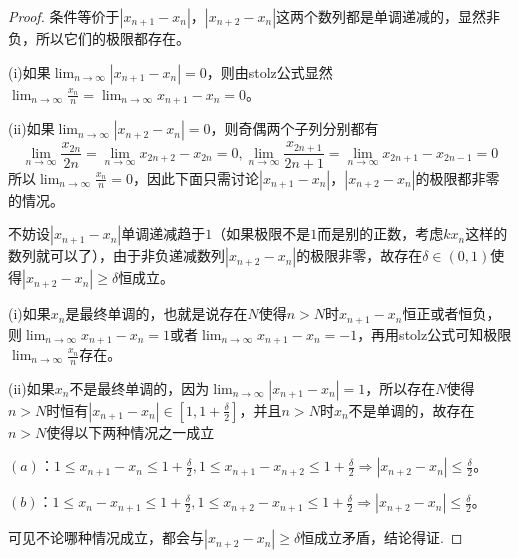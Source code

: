 \documentclass[../../main.tex]{subfiles}
\begin{document}
\begin{proof}
条件等价于\(|x_{n + 1}-x_n|\)，\(|x_{n + 2}-x_n|\)这两个数列都是单调递减的，显然非负，所以它们的极限都存在。

(i)如果\(\lim_{n\rightarrow\infty}|x_{n + 1}-x_n| = 0\)，则由stolz公式显然\(\lim_{n\rightarrow\infty}\frac{x_n}{n}=\lim_{n\rightarrow\infty}x_{n + 1}-x_n = 0\)。

(ii)如果\(\lim_{n\rightarrow\infty}|x_{n + 2}-x_n| = 0\)，则奇偶两个子列分别都有
\[
\lim_{n\rightarrow\infty}\frac{x_{2n}}{2n}=\lim_{n\rightarrow\infty}x_{2n + 2}-x_{2n}=0, 
\lim_{n\rightarrow\infty}\frac{x_{2n + 1}}{2n + 1}=\lim_{n\rightarrow\infty}x_{2n + 1}-x_{2n - 1}=0
\]
所以\(\lim_{n\rightarrow\infty}\frac{x_n}{n}=0\)，因此下面只需讨论\(|x_{n + 1}-x_n|\)，\(|x_{n + 2}-x_n|\)的极限都非零的情况。

不妨设\(|x_{n + 1}-x_n|\)单调递减趋于\(1\)（如果极限不是\(1\)而是别的正数，考虑\(kx_n\)这样的数列就可以了），由于非负递减数列\(|x_{n + 2}-x_n|\)的极限非零，故存在\(\delta\in(0,1)\)使得\(|x_{n + 2}-x_n|\geqslant \delta\)恒成立。

(i)如果\(x_n\)是最终单调的，也就是说存在\(N\)使得\(n > N\)时\(x_{n + 1}-x_n\)恒正或者恒负，则\(\lim_{n\rightarrow\infty}x_{n + 1}-x_n = 1\)或者\(\lim_{n\rightarrow\infty}x_{n + 1}-x_n=-1\)，再用stolz公式可知极限\(\lim_{n\rightarrow\infty}\frac{x_n}{n}\)存在。

(ii)如果\(x_n\)不是最终单调的，因为\(\lim_{n\rightarrow\infty}|x_{n + 1}-x_n| = 1\)，所以存在\(N\)使得\(n > N\)时恒有\(|x_{n + 1}-x_n|\in\left[1,1+\frac{\delta}{2}\right]\)，并且\(n > N\)时\(x_n\)不是单调的，故存在\(n > N\)使得以下两种情况之一成立

\((a)\)：\(1\leqslant  x_{n + 1}-x_n\leqslant 1+\frac{\delta}{2},1\leqslant  x_{n + 1}-x_{n + 2}\leqslant 1+\frac{\delta}{2}\Rightarrow|x_{n + 2}-x_n|\leqslant \frac{\delta}{2}\)。

\((b)\)：\(1\leqslant  x_n - x_{n + 1}\leqslant 1+\frac{\delta}{2},1\leqslant  x_{n + 2}-x_{n + 1}\leqslant 1+\frac{\delta}{2}\Rightarrow|x_{n + 2}-x_n|\leqslant \frac{\delta}{2}\)。

可见不论哪种情况成立，都会与\(|x_{n + 2}-x_n|\geqslant \delta\)恒成立矛盾，结论得证.

\end{proof}
\end{document}
